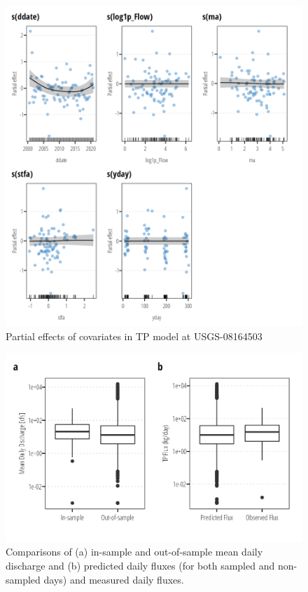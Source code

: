 \documentclass[
]{article}
\begin{document}
\begin{figure}[h]

{\centering \includegraphics{model_assessment_files/figure-pdf/unnamed-chunk-59-1.png}

}

\caption{Partial effects of covariates in TP model at USGS-08164503}

\end{figure}

\begin{figure}[h]

{\centering \includegraphics{model_assessment_files/figure-pdf/unnamed-chunk-60-1.png}

}

\caption{Comparisons of (a) in-sample and out-of-sample mean daily
discharge and (b) predicted daily fluxes (for both sampled and
non-sampled days) and measured daily fluxes.}

\end{figure}
\end{document}
